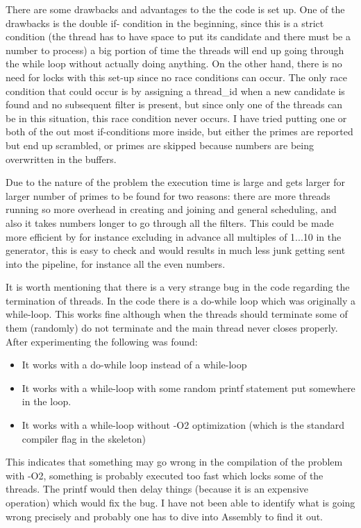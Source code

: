 \documentclass[11pt,a4paper,onecolumn]{article}
\begin{document}
There are some drawbacks and advantages to the the code is set up. One of the drawbacks is the double if- condition in the beginning, since this is a strict condition (the thread has to have space to put its candidate and there must be a number to process) a big portion of time the threads will end up going through the while loop without actually doing anything. On the other hand, there is no need for locks with this set-up since no race conditions can occur. The only race condition that could occur is by assigning a thread\_id when a new candidate is found and no subsequent filter is present, but since only one of the threads can be in this situation, this race condition never occurs. I have tried putting one or both of the out most if-conditions more inside, but either the primes are reported but end up scrambled, or primes are skipped because numbers are being overwritten in the buffers.

Due to the nature of the problem the execution time is large and gets larger for larger number of primes to be found for two reasons: there are more threads running so more overhead in creating and joining and general scheduling, and also it takes numbers longer to go through all the filters. This could be made more efficient by for instance excluding in advance all multiples of 1...10 in the generator, this is easy to check and would results in much less junk getting sent into the pipeline, for instance all the even numbers.

It is worth mentioning that there is a very strange bug in the code regarding the termination of threads. In the code there is a do-while loop which was originally a while-loop. This works fine although when the threads should terminate some of them (randomly) do not terminate and the main thread never closes properly. After experimenting the following was found:
\begin{itemize}
\item 
  It works with a do-while loop instead of a while-loop
\item
  It works with a while-loop with some random printf statement put somewhere in the loop.
\item
  It works with a while-loop without -O2 optimization (which is the standard compiler flag in the skeleton)
\end{itemize}
This indicates that something may go wrong in the compilation of the problem with -O2, something is probably executed too fast which locks some of the threads. The printf would then delay things (because it is an expensive operation) which would fix the bug. I have not been able to identify what is going wrong precisely and probably one has to dive into Assembly to find it out.
\end{document}
